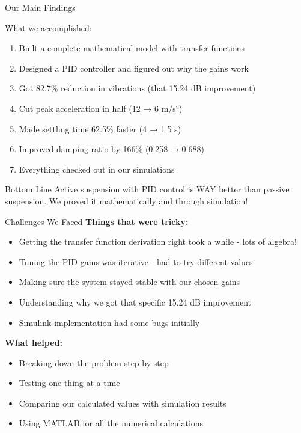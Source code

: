 \documentclass[aspectratio=169]{beamer}
\begin{document}
\begin{frame}{Our Main Findings}
  \begin{block}{What we accomplished:}
    \begin{enumerate}
      \item Built a complete mathematical model with transfer functions
      \item Designed a PID controller and figured out why the gains work
      \item Got 82.7\% reduction in vibrations (that 15.24 dB improvement)
      \item Cut peak acceleration in half (12 → 6 m/s²)
      \item Made settling time 62.5\% faster (4 → 1.5 s)
      \item Improved damping ratio by 166\% (0.258 → 0.688)
      \item Everything checked out in our simulations
    \end{enumerate}
  \end{block}
  
  \vspace{0.3cm}
  
  \begin{alertblock}{Bottom Line}
    Active suspension with PID control is WAY better than passive suspension. We proved it mathematically and through simulation!
  \end{alertblock}
\end{frame}

\begin{frame}{Challenges We Faced}
  \textbf{Things that were tricky:}
  
  \begin{itemize}
    \item Getting the transfer function derivation right took a while - lots of algebra!
    \item Tuning the PID gains was iterative - had to try different values
    \item Making sure the system stayed stable with our chosen gains
    \item Understanding why we got that specific 15.24 dB improvement
    \item Simulink implementation had some bugs initially
  \end{itemize}
  
  \vspace{0.5cm}
  
  \textbf{What helped:}
  \begin{itemize}
    \item Breaking down the problem step by step
    \item Testing one thing at a time
    \item Comparing our calculated values with simulation results
    \item Using MATLAB for all the numerical calculations
  \end{itemize}
\end{frame}
\end{document}
